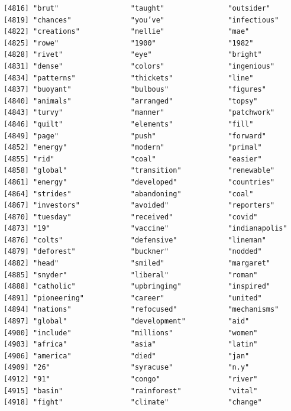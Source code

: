 \documentclass[
  letterpaper,
  DIV=11,
  numbers=noendperiod]{scrartcl}
\begin{document}
\begin{verbatim}
[4816] "brut"                 "taught"               "outsider"            
[4819] "chances"              "you’ve"               "infectious"          
[4822] "creations"            "nellie"               "mae"                 
[4825] "rowe"                 "1900"                 "1982"                
[4828] "rivet"                "eye"                  "bright"              
[4831] "dense"                "colors"               "ingenious"           
[4834] "patterns"             "thickets"             "line"                
[4837] "buoyant"              "bulbous"              "figures"             
[4840] "animals"              "arranged"             "topsy"               
[4843] "turvy"                "manner"               "patchwork"           
[4846] "quilt"                "elements"             "fill"                
[4849] "page"                 "push"                 "forward"             
[4852] "energy"               "modern"               "primal"              
[4855] "rid"                  "coal"                 "easier"              
[4858] "global"               "transition"           "renewable"           
[4861] "energy"               "developed"            "countries"           
[4864] "strides"              "abandoning"           "coal"                
[4867] "investors"            "avoided"              "reporters"           
[4870] "tuesday"              "received"             "covid"               
[4873] "19"                   "vaccine"              "indianapolis"        
[4876] "colts"                "defensive"            "lineman"             
[4879] "deforest"             "buckner"              "nodded"              
[4882] "head"                 "smiled"               "margaret"            
[4885] "snyder"               "liberal"              "roman"               
[4888] "catholic"             "upbringing"           "inspired"            
[4891] "pioneering"           "career"               "united"              
[4894] "nations"              "refocused"            "mechanisms"          
[4897] "global"               "development"          "aid"                 
[4900] "include"              "millions"             "women"               
[4903] "africa"               "asia"                 "latin"               
[4906] "america"              "died"                 "jan"                 
[4909] "26"                   "syracuse"             "n.y"                 
[4912] "91"                   "congo"                "river"               
[4915] "basin"                "rainforest"           "vital"               
[4918] "fight"                "climate"              "change"              

\end{verbatim}
\end{document}
